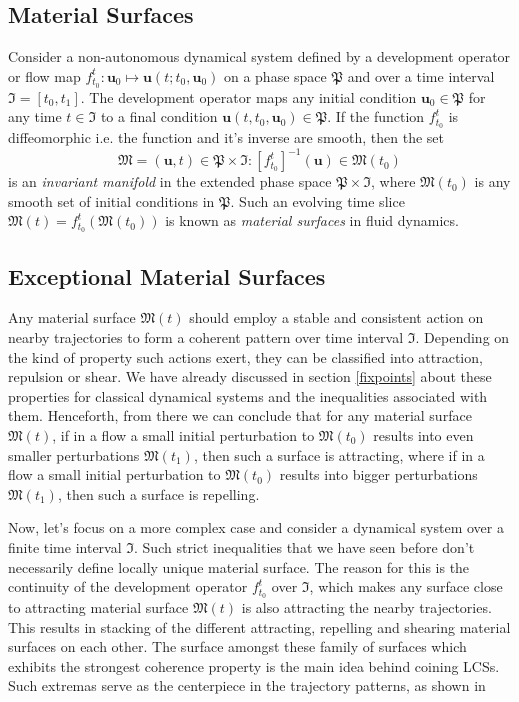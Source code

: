 \subsection{Material Surfaces}
Consider a non-autonomous dynamical system defined by a development operator or flow map $ f_{t_{0}}^{t}: \textbf{u}_{0}\mapsto \textbf{u}(t;t_{0},\textbf{u}_{0}) $ on a phase space $ \mathfrak{P} $ and over a time interval $\mathfrak{I} = [t_{0},t_{1}]$. The development operator maps any initial condition $\textbf{u}_{0} \in \mathfrak{P}$ for any time $ t \in \mathfrak{I} $ to a final condition $ \textbf{u}( t,t_{0}, \textbf{u}_{0} ) \in \mathfrak{P} $. If the function $ f_{t_{0}}^{t} $ is diffeomorphic i.e. the function and it's inverse are smooth, then the set
\begin{equation}
\mathfrak{M} = {(\textbf{u},t) \in \mathfrak{P}\times\mathfrak{I}:[f_{t_{0}}^{t}]^{-1}(\textbf{u})\in \mathfrak{M}(t_{0})} 
\end{equation}
is an \textit{invariant manifold} in the extended phase space $ \mathfrak{P}\times\mathfrak{I} $, where $ \mathfrak{M}(t_{0}) $ is any smooth set  of initial conditions in $ \mathfrak{P} $. Such an evolving time slice $ \mathfrak{M}(t)=f_{t_{0}}^{t}(\mathfrak{M}(t_{0})) $ is known as \textit{material surfaces} in fluid dynamics. 

\subsection{Exceptional Material Surfaces}
Any material surface $ \mathfrak{M}(t) $ should employ a stable and consistent action on nearby trajectories to form a coherent pattern over time interval $ \mathfrak{I} $. Depending on the kind of property such actions exert, they can be classified into attraction, repulsion or shear. We have already discussed in section \ref{fixpoints} about these properties for classical dynamical systems and the inequalities associated with them. Henceforth, from there we can conclude that for any material surface $ \mathfrak{M}(t) $, if in a flow a small initial perturbation to $ \mathfrak{M}(t_{0}) $ results into even smaller perturbations $ \mathfrak{M}(t_{1}) $, then such a surface is attracting, where if in a flow a small initial perturbation to $ \mathfrak{M}(t_{0}) $ results into bigger perturbations $ \mathfrak{M}(t_{1}) $, then such a surface is repelling. 

Now, let's focus on a more complex case and consider a dynamical system over a finite time interval $ \mathfrak{I} $. Such strict inequalities that we have seen before don't necessarily define locally unique material surface. The reason for this is the continuity of the development operator $ f_{t_{0}}^{t} $ over $ \mathfrak{I} $, which makes any surface close to attracting material surface $ \mathfrak{M}(t) $ is also attracting the nearby trajectories. This results in stacking of the different attracting, repelling and shearing material surfaces on each other. The surface amongst these family of surfaces which exhibits the strongest coherence property is the main idea behind coining LCSs. Such extremas serve as the centerpiece in the trajectory patterns, as shown in


